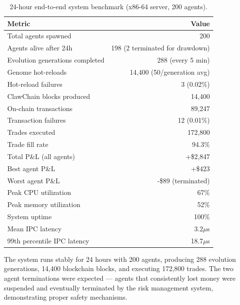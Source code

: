 \documentclass{article}
\begin{document}
\begin{table}[t]
\caption{24-hour end-to-end system benchmark (x86-64 server, 200 agents).}
\label{tab:e2e}
\centering
\small
\begin{tabular}{lr}
\toprule
\textbf{Metric} & \textbf{Value} \\
\midrule
Total agents spawned & 200 \\
Agents alive after 24h & 198 (2 terminated for drawdown) \\
Evolution generations completed & 288 (every 5 min) \\
Genome hot-reloads & 14,400 (50/generation avg) \\
Hot-reload failures & 3 (0.02\%) \\
ClawChain blocks produced & 14,400 \\
On-chain transactions & 89,247 \\
Transaction failures & 12 (0.01\%) \\
Trades executed & 172,800 \\
Trade fill rate & 94.3\% \\
Total P\&L (all agents) & +\$2,847 \\
Best agent P\&L & +\$423 \\
Worst agent P\&L & -\$89 (terminated) \\
Peak CPU utilization & 67\% \\
Peak memory utilization & 52\% \\
System uptime & 100\% \\
Mean IPC latency & 3.2$\mu$s \\
99th percentile IPC latency & 18.7$\mu$s \\
\bottomrule
\end{tabular}
\end{table}

The system runs stably for 24 hours with 200 agents, producing 288 evolution generations, 14,400 blockchain blocks, and executing 172,800 trades. The two agent terminations were expected — agents that consistently lost money were suspended and eventually terminated by the risk management system, demonstrating proper safety mechanisms.
\end{document}
